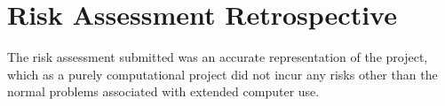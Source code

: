 
\chapter{Risk Assessment Retrospective}

\label{appx:HSR}

The risk assessment submitted was an accurate representation of the project,
which as a purely computational project did not incur any risks other than the
normal problems associated with extended computer use.

